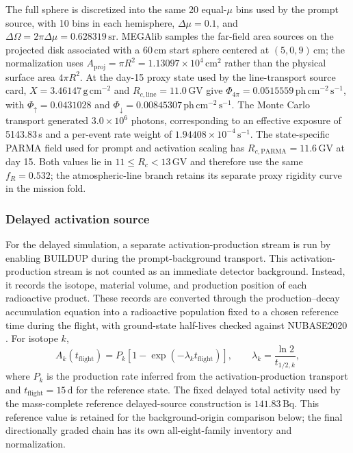 \documentclass[11pt]{article}
\begin{document}
The full sphere is discretized into the same 20 equal-$\mu$ bins used by the
prompt source, with 10 bins in each hemisphere, $\Delta\mu=0.1$, and
$\Delta\Omega=2\pi\Delta\mu=0.628319\,\mathrm{sr}$. MEGAlib
samples the far-field area sources on the projected disk
associated with a 60\,cm start sphere centered at $(5,0,9)$\,cm; the normalization
uses $A_{\mathrm{proj}}=\pi R^2=1.13097\times10^4\,\mathrm{cm^2}$ rather than
the physical surface area $4\pi R^2$. At the day-15 proxy state used by the
line-transport source card, $X=3.46147\,\mathrm{g\,cm^{-2}}$ and
$R_{c,\mathrm{line}}=11.0\,\mathrm{GV}$ give $\Phi_{4\pi}=0.0515559\,
\mathrm{ph\,cm^{-2}\,s^{-1}}$, with $\Phi_{\uparrow}=0.0431028$ and
$\Phi_{\downarrow}=0.00845307\,\mathrm{ph\,cm^{-2}\,s^{-1}}$. The Monte Carlo
transport generated $3.0\times10^6$ photons, corresponding to an effective
exposure of 5143.83\,s and a per-event rate weight of
$1.94408\times10^{-4}\,\mathrm{s^{-1}}$. The state-specific PARMA field used
for prompt and activation scaling has $R_{c,\mathrm{PARMA}}=11.6\,\mathrm{GV}$
at day 15. Both values lie in $11\le R_c<13\,\mathrm{GV}$ and therefore use the
same $f_R=0.532$; the atmospheric-line branch retains its separate proxy rigidity
curve in the mission fold.

\subsubsection{Delayed activation source}
\label{subsec:delayed_source}

For the delayed simulation, a separate activation-production stream is run by
enabling BUILDUP during the prompt-background transport. This
activation-production stream is not counted as an immediate detector background.
Instead, it records the isotope, material volume, and production position of
each radioactive product. These records are converted through the
production--decay accumulation equation into a radioactive population fixed to a
chosen reference time during the flight, with ground-state half-lives checked
against NUBASE2020 \cite{Kondev2021NUBASE}. For isotope $k$,
\begin{equation}
  A_k(t_{\mathrm{flight}}) = P_k\left[1-\exp\left(-\lambda_k t_{\mathrm{flight}}\right)\right],
  \qquad \lambda_k = \frac{\ln 2}{t_{1/2,k}},
\end{equation}
where $P_k$ is the production rate inferred from the activation-production
transport and $t_{\mathrm{flight}}=15\,\mathrm{d}$ for the reference state.
The fixed delayed total activity used by the mass-complete reference
delayed-source construction is $141.83\,\mathrm{Bq}$. This reference value is
retained for the background-origin comparison below; the final directionally graded chain has
its own all-eight-family inventory and normalization.
\end{document}

